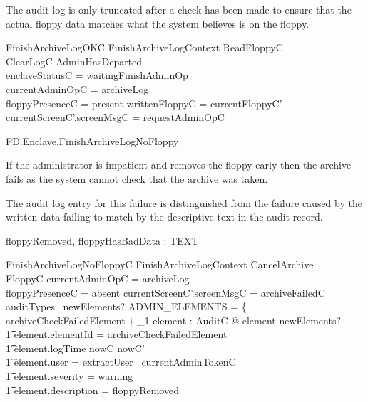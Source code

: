 The audit log is only truncated after a check has been made to ensure
that the actual floppy data matches what the system believes is on the
floppy. 

\begin{schema}{FinishArchiveLogOKC}
        FinishArchiveLogContext
\also
        ReadFloppyC
\\      ClearLogC
\where
        \lnot AdminHasDeparted
\\      enclaveStatusC = waitingFinishAdminOp
\\      \The currentAdminOpC = archiveLog
\\      floppyPresenceC = present
\also
        writtenFloppyC = currentFloppyC'
\also
        currentScreenC'.screenMsgC = requestAdminOpC
\end{schema}



\begin{traceunit}{FD.Enclave.FinishArchiveLogNoFloppy}
\end{traceunit}

If the administrator is impatient and removes the floppy early then
the archive fails as the system cannot check that the archive was taken.

The audit log entry for this failure is distinguished from the failure
caused by the written data failing to match by the descriptive text in
the audit record.

\begin{axdef}
        floppyRemoved, floppyHasBadData : TEXT
\end{axdef}

\begin{schema}{FinishArchiveLogNoFloppyC}
        FinishArchiveLogContext
\also
        CancelArchive
\\      \Xi FloppyC
\where
       \The currentAdminOpC = archiveLog
\\      floppyPresenceC = absent
\also
        currentScreenC'.screenMsgC = archiveFailedC
\also
        auditTypes~ newElements? \cap ADMIN\_ELEMENTS = 
        \{ archiveCheckFailedElement \} 
\also
        \exists_1 element : AuditC @ element \in newElements? 
\\ \t1  \land element.elementId = archiveCheckFailedElement
\\ \t1  \land element.logTime \in nowC \upto nowC'
\\ \t1  \land element.user = extractUser~ currentAdminTokenC
\\ \t1  \land element.severity = warning
\\ \t1  \land element.description = floppyRemoved
\end{schema}


